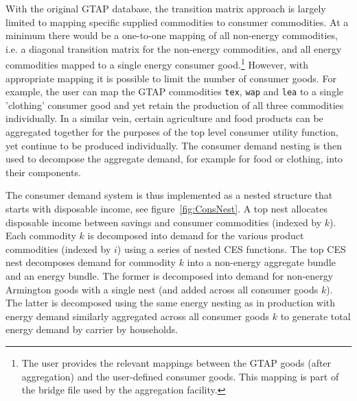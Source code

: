 \documentclass[11pt,letterpaper]{report}
\begin{document}
With the original GTAP database, the transition matrix approach is largely
limited to mapping specific supplied commodities to consumer commodities. At a
minimum there would be a one-to-one mapping of all non-energy commodities, i.e.
a diagonal transition matrix for the non-energy commodities, and all energy
commodities mapped to a single energy consumer good.\footnote{The user provides
the relevant mappings between the GTAP goods (after aggregation) and the
user-defined consumer goods. This mapping is part of the bridge file used by the
aggregation facility.} However, with appropriate mapping it is possible to limit
the number of consumer goods. For example, the user can map the GTAP commodities
\texttt{tex}, \texttt{wap} and \texttt{lea} to a single 'clothing' consumer good
and yet retain the production of all three commodities individually. In a
similar vein, certain agriculture and food products can be aggregated together
for the purposes of the top level consumer utility function, yet continue to be
produced individually. The consumer demand nesting is then used to decompose the
aggregate demand, for example for food or clothing, into their components.

The consumer demand system is thus implemented as a nested structure that starts
with disposable income, see figure~\ref{fig:ConsNest}. A top nest allocates
disposable income between savings and consumer commodities (indexed by $k$).
Each commodity $k$ is decomposed into demand for the various product commodities
(indexed by $i$) using a series of nested CES functions. The top CES nest
decomposes demand for commodity $k$ into a non-energy aggregate bundle and an
energy bundle. The former is decomposed into demand for non-energy Armington
goods with a single nest (and added across all consumer goods $k$). The latter
is decomposed using the same energy nesting as in production with energy demand
similarly aggregated across all consumer goods $k$ to generate total energy
demand by carrier by households.
\end{document}
